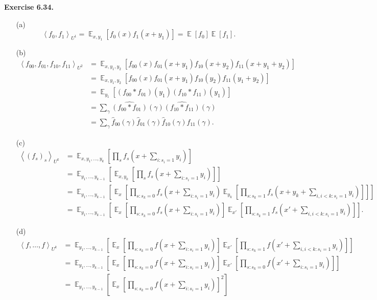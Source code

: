 \documentclass[a4paper]{article}
\newenvironment{exercise}[1]{
	\par
	\noindent\textbf{Exercise #1.}\quad
}{
	\par
	\bigskip
}
\DeclareMathOperator*{\E}{\mathbb E}
\newcommand{\abra}[1]{{\left\langle #1 \right\rangle}}
\newcommand{\sbra}[1]{{\left[ #1 \right]}}
\begin{document}
\begin{exercise}{6.34}
    \begin{itemize}
        \item[(a)]
            $$
            \abra{f_0,f_1}_{U^1}=\E_{x,y_1}\sbra{f_0(x)f_1(x+y_1)}=\E[f_0]\E[f_1].
            $$
        \item[(b)]
            \begin{align*}
            \abra{f_{00},f_{01},f_{10},f_{11}}_{U^2}
                &=\E_{x,y_1,y_2}\sbra{f_{00}(x)f_{01}(x+y_1)f_{10}(x+y_2)f_{11}(x+y_1+y_2)}\\
                &=\E_{x,y_1,y_2}\sbra{f_{00}(x)f_{01}(x+y_1)f_{10}(y_2)f_{11}(y_1+y_2)}\\
                &=\E_{y_1}\sbra{(f_{00}*f_{01})(y_1)(f_{10}*f_{11})(y_1)}\\
                &=\sum_\gamma\widehat{(f_{00}*f_{01})}(\gamma)\widehat{(f_{10}*f_{11})}(\gamma)\\
                &=\sum_\gamma\hat f_{00}(\gamma)\hat f_{01}(\gamma)\hat f_{10}(\gamma)\hat f_{11}(\gamma).
            \end{align*}
        \item[(c)]
            \begin{align*}
                \abra{(f_s)_s}_{U^k}
                &=\E_{x,y_1,\ldots,y_k}\sbra{\prod_sf_s(x+\sum_{i:s_i=1}y_i)}\\
                &=\E_{y_1,\ldots,y_{k-1}}\sbra{\E_{x,y_k}\sbra{\prod_sf_s(x+\sum_{i:s_i=1}y_i)}}\\
                &=\E_{y_1,\ldots,y_{k-1}}\sbra{\E_x\sbra{\prod_{s:s_k=0}f_s(x+\sum_{i:s_i=1}y_i)\E_{y_k}\sbra{\prod_{s:s_k=1}f_s(x+y_k+\sum_{i,i<k:s_i=1}y_i)}}}\\
                &=\E_{y_1,\ldots,y_{k-1}}\sbra{\E_x\sbra{\prod_{s:s_k=0}f_s(x+\sum_{i:s_i=1}y_i)}\E_{x'}\sbra{\prod_{s:s_k=1}f_s(x'+\sum_{i,i<k:s_i=1}y_i)}}.
            \end{align*}
        \item[(d)] 
            \begin{align*}
            \abra{f,\ldots,f}_{U^k}
                &=\E_{y_1,\ldots,y_{k-1}}\sbra{\E_x\sbra{\prod_{s:s_k=0}f(x+\sum_{i:s_i=1}y_i)}\E_{x'}\sbra{\prod_{s:s_k=1}f(x'+\sum_{i,i<k:s_i=1}y_i)}}\\
                &=\E_{y_1,\ldots,y_{k-1}}\sbra{\E_x\sbra{\prod_{s:s_k=0}f(x+\sum_{i:s_i=1}y_i)}\E_{x'}\sbra{\prod_{s:s_k=0}f(x'+\sum_{i:s_i=1}y_i)}}\\
                &=\E_{y_1,\ldots,y_{k-1}}\sbra{\E_x\sbra{\prod_{s:s_k=0}f(x+\sum_{i:s_i=1}y_i)}^2}\\

\end{align*}
\end{itemize}
\end{exercise}
\end{document}
